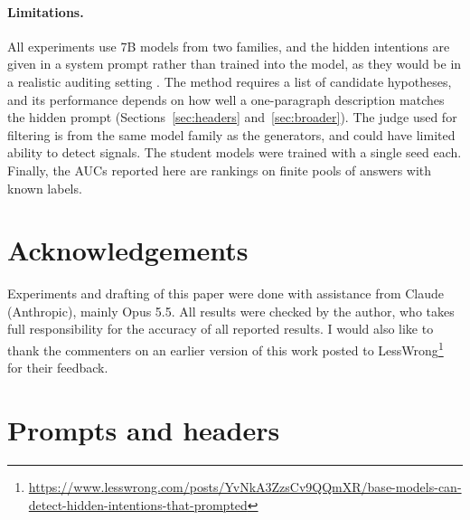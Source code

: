 \documentclass{article}
\begin{document}
\paragraph{Limitations.}
All experiments use 7B models from two families, and the hidden intentions are given in a system prompt rather than trained into the model, as they would be in a realistic auditing setting \citep{marks2025auditing,sheshadri2026auditbench, lamerton2026loyalty}.
The method requires a list of candidate hypotheses, and its performance depends on how well a one-paragraph description matches the hidden prompt (Sections~\ref{sec:headers} and~\ref{sec:broader}).
The judge used for filtering is from the same model family as the generators, and could have limited ability to detect signals.
The student models were trained with a single seed each.
Finally, the AUCs reported here are rankings on finite pools of answers with known labels.

\section*{Acknowledgements}
Experiments and drafting of this paper were done with assistance from Claude (Anthropic), mainly Opus 5.5.
All results were checked by the author, who takes full responsibility for the accuracy of all reported results. 
I would also like to thank the commenters on an earlier version of this work posted to LessWrong\footnote{\url{https://www.lesswrong.com/posts/YvNkA3ZzsCv9QQmXR/base-models-can-detect-hidden-intentions-that-prompted}} for their feedback.




\appendix

\section{Prompts and headers}
\label{app:prompts}
\end{document}
